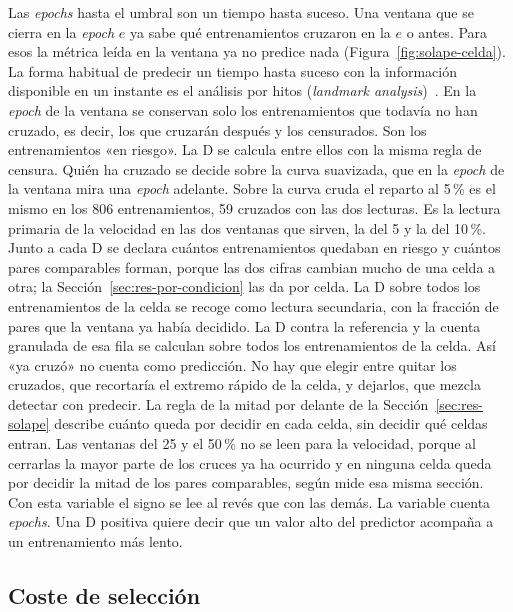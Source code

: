 Las \emph{epochs} hasta el umbral son un tiempo hasta suceso. Una ventana que se cierra en la \emph{epoch} $e$ ya sabe qué entrenamientos cruzaron en la $e$ o antes. Para esos la métrica leída en la ventana ya no predice nada (Figura~\ref{fig:solape-celda}). La forma habitual de predecir un tiempo hasta suceso con la información disponible en un instante es el análisis por hitos (\emph{landmark analysis})~\cite{anderson1983analysis,dafni2011landmark}. En la \emph{epoch} de la ventana se conservan solo los entrenamientos que todavía no han cruzado, es decir, los que cruzarán después y los censurados. Son los entrenamientos «en riesgo». La D se calcula entre ellos con la misma regla de censura. Quién ha cruzado se decide sobre la curva suavizada, que en la \emph{epoch} de la ventana mira una \emph{epoch} adelante. Sobre la curva cruda el reparto al 5\,\% es el mismo en los 806 entrenamientos, 59 cruzados con las dos lecturas. Es la lectura primaria de la velocidad en las dos ventanas que sirven, la del 5 y la del 10\,\%. Junto a cada D se declara cuántos entrenamientos quedaban en riesgo y cuántos pares comparables forman, porque las dos cifras cambian mucho de una celda a otra; la Sección~\ref{sec:res-por-condicion} las da por celda. La D sobre todos los entrenamientos de la celda se recoge como lectura secundaria, con la fracción de pares que la ventana ya había decidido. La D contra la referencia y la cuenta granulada de esa fila se calculan sobre todos los entrenamientos de la celda. Así «ya cruzó» no cuenta como predicción. No hay que elegir entre quitar los cruzados, que recortaría el extremo rápido de la celda, y dejarlos, que mezcla detectar con predecir. La regla de la mitad por delante de la Sección~\ref{sec:res-solape} describe cuánto queda por decidir en cada celda, sin decidir qué celdas entran. Las ventanas del 25 y el 50\,\% no se leen para la velocidad, porque al cerrarlas la mayor parte de los cruces ya ha ocurrido y en ninguna celda queda por decidir la mitad de los pares comparables, según mide esa misma sección. Con esta variable el signo se lee al revés que con las demás. La variable cuenta \emph{epochs}. Una D positiva quiere decir que un valor alto del predictor acompaña a un entrenamiento más lento.

\subsection{Coste de selección}
\label{sec:protocolo-seleccion}

